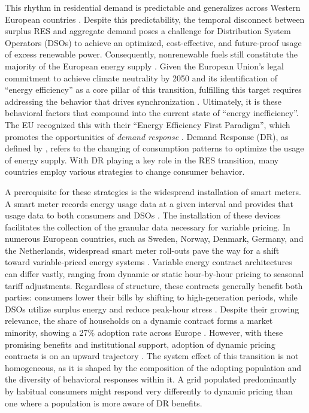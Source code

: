 \documentclass[11pt, a4paper]{article}
\begin{document}
This rhythm in residential demand is predictable and generalizes across Western European countries \autocite{anvari_data-driven_2022,liander_openstefliander2024-energy-forecasting-benchmark_2024}. Despite this predictability, the temporal disconnect between surplus RES and aggregate demand poses a challenge for Distribution System Operators (DSOs) to achieve an optimized, cost-effective, and future-proof usage of excess renewable power. Consequently, nonrenewable fuels still constitute the majority of the European energy supply \autocite{eurostat_energy_2026}. Given the European Union's legal commitment to achieve climate neutrality by 2050 and its identification of ``energy efficiency'' as a core pillar of this transition, fulfilling this target requires addressing the behavior that drives synchronization \autocite{consilium_climate_2026}. Ultimately, it is these behavioral factors that compound into the current state of ``energy inefficiency''. The EU recognized this with their ``Energy Efficiency First Paradigm'', which promotes the opportunities of \textit{demand response} \autocite{european_climate_foundation_efficiency_2016}. Demand Response (DR), as defined by \textcite{wohlfarth_energy_2020}, refers to the changing of consumption patterns to optimize the usage of energy supply. With DR playing a key role in the RES transition, many countries employ various strategies to change consumer behavior. 

A prerequisite for these strategies is the widespread installation of smart meters. A smart meter records energy usage data at a given interval and provides that usage data to both consumers and DSOs \autocite{zhou_smart_2017}. The installation of these devices facilitates the collection of the granular data necessary for variable pricing. In numerous European countries, such as Sweden, Norway, Denmark, Germany, and the Netherlands, widespread smart meter roll-outs pave the way for a shift toward variable-priced energy systems \autocite{eid_time-based_2016,zhou_smart_2017,rijksinspectie_digitale_infrastructuur_wettelijke_2025}. Variable energy contract architectures can differ vastly, ranging from dynamic or static hour-by-hour pricing to seasonal tariff adjustments. Regardless of structure, these contracts generally benefit both parties: consumers lower their bills by shifting to high-generation periods, while DSOs utilize surplus energy and reduce peak-hour stress \autocite{johanning_integrative_2024}. Despite their growing relevance, the share of households on a dynamic contract forms a market minority, showing a 27\% adoption rate across Europe \autocite{acer-ceer_market_2024}. However, with these promising benefits and institutional support, adoption of dynamic pricing contracts is on an upward trajectory \autocite{johanning_integrative_2024}. The system effect of this transition is not homogeneous, as it is shaped by the composition of the adopting population and the diversity of behavioral responses within it. A grid populated predominantly by habitual consumers might respond very differently to dynamic pricing than one where a population is more aware of DR benefits.
\end{document}
